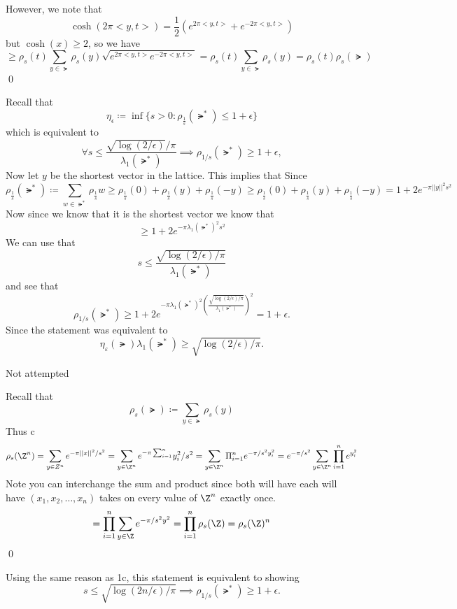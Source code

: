 \documentclass[12pt]{amsart}
\begin{document}
\begin{problem}
\begin{subproblem}
      However, we note that 
      \[ \cosh(2\pi <y,t>) = \frac12 (e^{2\pi <y,t>}+e^{-2\pi <y,t>})\]
      but $\cosh(x)\geq 2$, so we have 
      \[\geq \rho_s(t)\sum_{y\in\lat}\rho_s(y)\sqrt{e^{2\pi<y,t>}e^{-2\pi<y,t>}} = \rho_s(t)\sum_{y\in\lat}\rho_s(y) = \rho_s(t)\rho_s(\lat)\]\qed
    \end{subproblem}
    \begin{subproblem}
      Recall that 
      \[\eta_\epsilon \coloneq \inf \{ s>0 :  \rho_{\frac1s}(\lat^*) \leq 1+\epsilon\}\]
      which is equivalent to 
      \[ \forall s \leq \frac{\sqrt{\log(2/\epsilon)}/\pi}{\lambda_1(\lat^*)} \implies \rho_{1/s}(\lat^*) \geq 1+\epsilon,\]
      Now let $y$ be the shortest vector in the lattice. This implies that 
      Since
      \[\rho_\frac1s(\lat^*) \coloneq \sum_{w\in\lat^*} \rho_\frac1s w \geq \rho_\frac1s(0) + \rho_\frac1s(y) + \rho_\frac1s(-y)\geq \rho_\frac1s(0)+\rho_\frac1s(y)+\rho_\frac1s(-y) = 1+2e^{-\pi||y||^2 s^2}\]
      Now since we know that it is the shortest vector we know that  
      \[\geq 1+2e^{-\pi\lambda_1(\lat^*)^2s^2}\]
      We can use that 
      \[ s \leq \frac{\sqrt{\log(2/\epsilon)/\pi}}{\lambda_1(\lat^*)}\]
      and see that 
      \[\rho_{1/s}(\lat^*) \geq 1+2e^{-\pi\lambda_1(\lat^*)^2\left(\frac{\sqrt{\log(2/\epsilon)/\pi}}{\lambda_1(\lat^*)}\right)^2} = 1+\epsilon.\]
      Since the statement was equivalent to 
      \[\eta_{\varepsilon}(\lat)\lambda_1(\lat^*) \geq \sqrt{\log(2/\epsilon)/\pi}.\]
    \end{subproblem}     
    \begin{subproblem}
      Not attempted 
    \end{subproblem}
    \begin{subproblem}
      Recall that 
      \[\rho_s(\lat)\coloneq \sum_{y\in\lat}\rho_s(y)\]
      Thus                                       c
      \[\rho_s(\Z^n) = \sum_{y\in Z^n} e^{-\pi ||x||^2/s^2} = \sum_{y\in \Z^n} e^{-\pi \sum_{i=1}^n}y_i^2 /s^2 = \sum_{y\in\Z^n}\Pi_{i=1}^n e^{-\pi/s^2 y_i^2} = e^{-\pi/s^2}\sum_{y\in \Z^n}\prod^n_{i=1}e^{y_i^2}\]
      Note you can interchange the sum and product since both will have each will have $(x_1,x_2, \dots, x_n)$ takes on every value of $\Z^n$ exactly once. 
      \[= \prod_{i=1}^n \sum_{y\in\Z} e^{-\pi/s^2 y^2} = \prod_{i=1}^n \rho_s(\Z) = \rho_s(\Z)^n\]\qed
    \end{subproblem}
    \begin{subproblem}
      Using the same reason as 1c, this statement is equivalent to showing 
      \[s \leq \sqrt{\log(2n/\epsilon)/\pi} \implies \rho_{1/s}(\lat^*) \geq 1+\epsilon.\]

\end{subproblem}
\end{problem}
\end{document}
